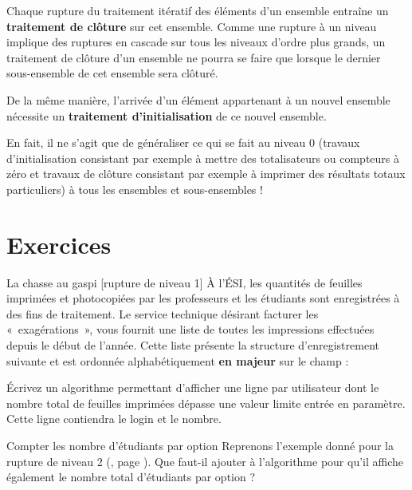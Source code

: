 	Chaque rupture du traitement itératif des éléments d’un ensemble
	entraîne un \textbf{traitement de clôture} sur cet ensemble. Comme une
	rupture à un niveau implique des ruptures en cascade sur tous les
	niveaux d’ordre plus grands, un traitement de clôture d’un ensemble ne
	pourra se faire que lorsque le dernier sous-ensemble de cet ensemble
	sera clôturé.
	
	De la même manière, l’arrivée d’un élément appartenant à un nouvel
	ensemble nécessite un \textbf{traitement d’initialisation} de ce nouvel
	ensemble.
	
	En fait, il ne s’agit que de généraliser ce qui se fait au niveau 0 
	(travaux d’initialisation consistant par exemple à mettre des totalisateurs 
	ou compteurs à zéro et travaux de clôture consistant par exemple 
	à imprimer des résultats totaux particuliers) 
	à tous les ensembles et sous-ensembles !
\section{Exercices}


\begin{Exercice}{La chasse au gaspi [rupture de niveau 1]}
	À l’ÉSI, les quantités de feuilles imprimées et photocopiées 
	par les professeurs et les étudiants sont enregistrées à des fins de traitement.
	Le service technique désirant facturer les «~exagérations~», 
	vous fournit une liste de toutes les impressions effectuées depuis le début de l'année.
	Cette liste présente la structure d’enregistrement  suivante 
	et est ordonnée alphabétiquement \textbf{en majeur} sur le champ   :

	\begin{LDA}
		\EndStruct
	\end{LDA}

	Écrivez un algorithme permettant d'afficher une ligne par
	utilisateur dont le nombre total de feuilles imprimées dépasse une
	valeur limite entrée en paramètre. 
	Cette ligne contiendra le login et le nombre.
\end{Exercice}

\begin{Exercice}{Compter les nombre d'étudiants par option}
	Reprenons l'exemple donné pour la rupture de niveau 2 (, page \pageref{algo:rupt2}).
	Que faut-il ajouter à l'algorithme pour qu'il affiche également 
	le nombre total d'étudiants par option ?
\end{Exercice}

